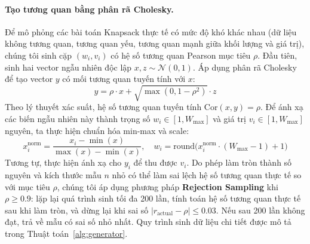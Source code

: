 \documentclass[fontsize=13pt,a4paper]{report}
\begin{document}
\paragraph{Tạo tương quan bằng phân rã Cholesky.} Để mô phỏng các bài toán Knapsack thực tế có mức độ khó khác nhau (dữ liệu không tương quan, tương quan yếu, tương quan mạnh giữa khối lượng và giá trị), chúng tôi sinh cặp $(w_i, v_i)$ có hệ số tương quan Pearson mục tiêu $\rho$. Đầu tiên, sinh hai vector ngẫu nhiên độc lập $x, z \sim \mathcal{N}(0, 1)$. Áp dụng phân rã Cholesky để tạo vector $y$ có mối tương quan tuyến tính với $x$:
\begin{equation}
    y = \rho \cdot x + \sqrt{\max(0, 1 - \rho^2)} \cdot z
    \label{eq:cholesky}
\end{equation}
Theo lý thuyết xác suất, hệ số tương quan tuyến tính $\text{Cor}(x, y) = \rho$. Để ánh xạ các biến ngẫu nhiên này thành trọng số $w_i \in [1, W_{\text{max}}]$ và giá trị $v_i \in [1, W_{\text{max}}]$ nguyên, ta thực hiện chuẩn hóa min-max và scale:
\begin{equation}
    x_i^{\text{norm}} = \frac{x_i - \min(x)}{\max(x) - \min(x)}, \quad w_i = \text{round}\big(x_i^{\text{norm}} \cdot (W_{\text{max}} - 1) + 1\big)
\end{equation}
Tương tự, thực hiện ánh xạ cho $y_i$ để thu được $v_i$. Do phép làm tròn thành số nguyên và kích thước mẫu $n$ nhỏ có thể làm sai lệch hệ số tương quan thực tế so với mục tiêu $\rho$, chúng tôi áp dụng phương pháp \textbf{Rejection Sampling} khi $\rho \ge 0.9$: lặp lại quá trình sinh tối đa 200 lần, tính toán hệ số tương quan thực tế sau khi làm tròn, và dừng lại khi sai số $|r_{\text{actual}} - \rho| \le 0.03$. Nếu sau 200 lần không đạt, trả về mẫu có sai số nhỏ nhất. Quy trình sinh dữ liệu chi tiết được mô tả trong Thuật toán~\ref{alg:generator}.
\end{document}

